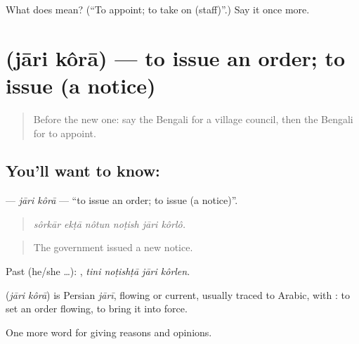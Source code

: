 \begin{tcolorbox}[breakable,colback=teal!4,colframe=teal!35!black,title={Before you move on}]
What does   mean? (\textquotedblleft{}To appoint; to take on (staff)\textquotedblright{}.) Say it once more.
\end{tcolorbox}
\section[\texorpdfstring{\bn{জারি} \bn{করা} (jāri kôrā)}{জারি করা (jāri kôrā)}]{  (jāri kôrā) — to issue an order; to issue (a notice)}

\label{lesson:BN-C347-jari-kora}



\begin{quote}
Before the new one: say the Bengali for a village council, then the Bengali for to appoint.
\end{quote}

\subsection*{You'll want to know:  }
\textbf{ } — \emph{jāri kôrā} — \textquotedblleft{}to issue an order; to issue (a notice)\textquotedblright{}.

\begin{quote}
     
\end{quote}

\begin{quote}
\emph{sôrkār ekṭā nôtun noṭish jāri kôrlô.}
\end{quote}

\begin{quote}
The government issued a new notice.
\end{quote}

Past (he/she …):    , \emph{tini noṭishṭā jāri kôrlen}.

\begin{cousinweb}
\textbf{ } (\emph{jāri kôrā}) is Persian \emph{jārī}, flowing or current, usually traced to Arabic, with : to set an order flowing, to bring it into force.
\end{cousinweb}

\begin{grammarlens}[title={What you've built}]
One more word for giving reasons and opinions.
\end{grammarlens}

